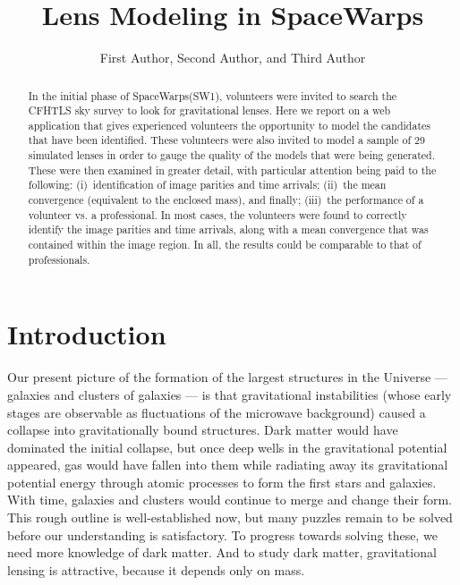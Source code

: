 \documentclass[12pt,preprint]{aastex}
\newcommand{\sw}{SpaceWarps\xspace}
\begin{document}
\title{Lens Modeling in \sw}
\author{First Author,
Second Author, and
Third Author}

\begin{abstract}
In the initial phase of \sw (SW1), volunteers were invited to search the CFHTLS sky survey to look for gravitational lenses.
Here we report on a web application that gives experienced volunteers the opportunity to model the candidates that have been identified.
These volunteers were also invited to model a sample of 29 simulated lenses in order to gauge the quality of the models that were being generated.
These were then examined in greater detail, with particular attention being paid to the following:
(i)~identification of image parities and time arrivals;
(ii)~the mean convergence (equivalent to the enclosed mass), and finally;
(iii)~the performance of a volunteer vs. a professional.
In most cases, the volunteers were found to correctly identify the image parities and time arrivals, along with a mean convergence that was contained within the image region.
In all, the results could be comparable to that of professionals.


\end{abstract}

\keywords{}
\section{Introduction}


Our present picture of the formation of the largest structures in the
Universe --- galaxies and clusters of galaxies --- is that
gravitational instabilities (whose early stages are observable as
fluctuations of the microwave background) caused a collapse into
gravitationally bound structures.  Dark matter would have dominated
the initial collapse, but once deep wells in the gravitational
potential appeared, gas would have fallen into them while radiating
away its gravitational potential energy through atomic processes to
form the first stars and galaxies.  With time, galaxies and clusters
would continue to merge and change their form.  This rough outline is
well-established now, but many puzzles remain to be solved before our
understanding is satisfactory.  To progress towards solving these, we
need more knowledge of dark matter.  And to study dark matter,
gravitational lensing is attractive, because it depends only on mass.
\end{document}
